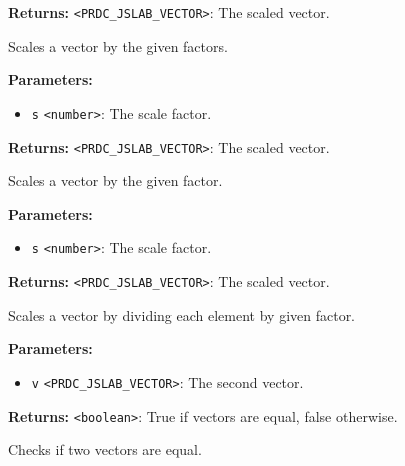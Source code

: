 \documentclass[12pt,a4paper]{article}
\begin{document}
\noindent \textbf{Returns:} \texttt{<PRDC\_JSLAB\_VECTOR>}: The scaled vector.

\noindent Scales a vector by the given factors.

\vspace{5mm}
\noindent {}


\noindent \textbf{Parameters:}
\begin{itemize}
  \item \texttt{s} \texttt{<number>}: The scale factor.
\end{itemize}

\noindent \textbf{Returns:} \texttt{<PRDC\_JSLAB\_VECTOR>}: The scaled vector.

\noindent Scales a vector by the given factor.

\vspace{5mm}
\noindent {}


\noindent \textbf{Parameters:}
\begin{itemize}
  \item \texttt{s} \texttt{<number>}: The scale factor.
\end{itemize}

\noindent \textbf{Returns:} \texttt{<PRDC\_JSLAB\_VECTOR>}: The scaled vector.

\noindent Scales a vector by dividing each element by given factor.

\vspace{5mm}
\noindent {}


\noindent \textbf{Parameters:}
\begin{itemize}
  \item \texttt{v} \texttt{<PRDC\_JSLAB\_VECTOR>}: The second vector.
\end{itemize}

\noindent \textbf{Returns:} \texttt{<boolean>}: True if vectors are equal, false otherwise.

\noindent Checks if two vectors are equal.

\vspace{5mm}
\noindent {}
\end{document}
